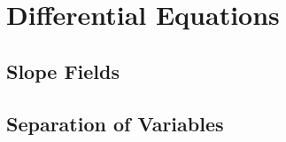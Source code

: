 \documentclass[../abcalc.tex]{subfiles}
\begin{document}
\chapter{Differential Equations}
\section{Slope Fields}
\section{Separation of Variables}
\end{document}
